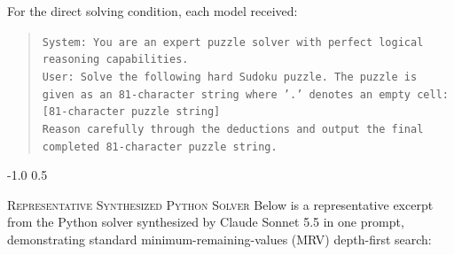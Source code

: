 \documentclass{article} %
\makeatletter
\renewcommand{\subsection}{\@startsection{subsection}{2}{\z@}%
  {-1.0\baselineskip}%
  {0.5\baselineskip}%
  {\normalfont\fontsize{10}{11}\selectfont\raggedright\scshape}}
\makeatother
\begin{document}
For the direct solving condition, each model received:
\begin{quote}
\small
\texttt{System: You are an expert puzzle solver with perfect logical reasoning capabilities.}\\
\texttt{User: Solve the following hard Sudoku puzzle. The puzzle is given as an 81-character string where '.' denotes an empty cell:}\\
\texttt{[81-character puzzle string]}\\
\texttt{Reason carefully through the deductions and output the final completed 81-character puzzle string.}
\end{quote}

\subsection{\textsc{Representative Synthesized Python Solver}}
Below is a representative excerpt from the Python solver synthesized by Claude Sonnet 5.5 in one prompt, demonstrating standard minimum-remaining-values (MRV) depth-first search:
\end{document}
